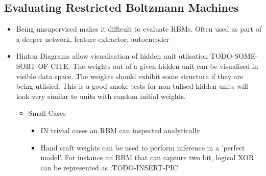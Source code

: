   \subsection{Evaluating Restricted Boltzmann Machines}

  \begin{itemize}
    \item Being unsupervised makes it difficult to evaluate RBMs. Often used as part of a deeper network, feature extractor, autoencoder
    \item Hinton Diagrams allow visualisation of hidden unit utlisation TODO-SOME-SORT-OF-CITE. The weights out of a given hidden unit can be visualised in visible data space. The weights should exhibit some structure if they are being utlisied. This is a good smoke tests for non-tulised hidden units will look very similar to units with random initial weights.
    \begin{itemize}
      \item Small Cases
      \begin{itemize}
        \item  IN trivial cases an RBM can inspected analytically
        \item Hand craft weights can be used to perform inference in a 'perfect model'. For instance an RBM that can capture two bit, logical XOR can be represented as :TODO-INSERT-PIC
      \end{itemize}
    \end{itemize}
  \end{itemize}

